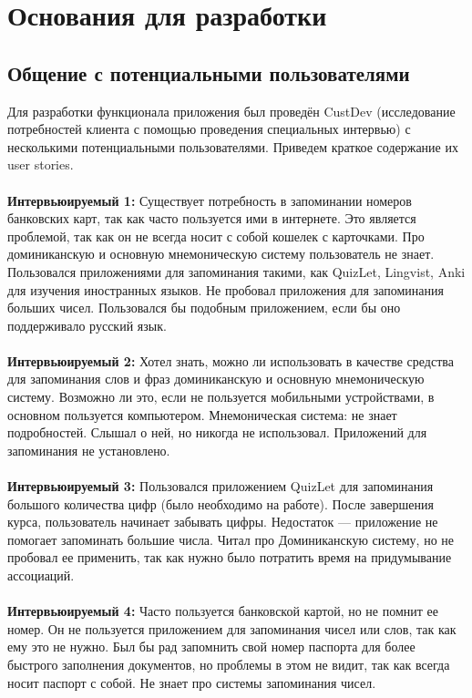 \documentclass[draft]{article}
\begin{document}
\section {Основания для разработки}
\subsection{Общение с потенциальными пользователями}
Для разработки функционала приложения был проведён CustDev (исследование потребностей клиента с помощью проведения специальных интервью) с несколькими потенциальными пользователями. Приведем краткое содержание их user stories.\\
~\\
\textbf{Интервьюируемый 1:} Существует потребность в запоминании номеров банковских карт, так как часто пользуется ими в интернете. Это является проблемой, так как он не всегда носит с собой кошелек с карточками. Про доминиканскую и основную мнемоническую систему пользователь не знает. Пользовался приложениями для запоминания такими, как QuizLet, Lingvist, Anki для изучения иностранных языков. Не пробовал приложения для запоминания больших чисел. Пользовался бы подобным приложением, если бы оно поддерживало русский язык.\\
~\\
\textbf{Интервьюируемый 2:} Хотел знать, можно ли использовать в качестве средства для запоминания слов и фраз доминиканскую и основную мнемоническую систему. Возможно ли это, если не пользуется мобильными устройствами, в основном пользуется компьютером. Мнемоническая система: не знает подробностей. Слышал о ней, но никогда не использовал. Приложений для запоминания не установлено.\\
~\\
\textbf{Интервьюируемый 3:} Пользовался приложением QuizLet для запоминания большого количества цифр (было необходимо на работе). После завершения курса, пользователь начинает забывать цифры. Недостаток — приложение не помогает запоминать большие числа. Читал про Доминиканскую систему, но не пробовал ее применить, так как нужно было потратить время на придумывание ассоциаций.\\
~\\
\textbf{Интервьюируемый 4:} Часто пользуется банковской картой, но не помнит ее номер. Он не пользуется приложением для запоминания чисел или слов, так как ему это не нужно. Был бы рад запомнить свой номер паспорта для более быстрого заполнения документов, но проблемы в этом не видит, так как всегда носит паспорт с собой. Не знает про системы запоминания чисел.\\
\end{document}
